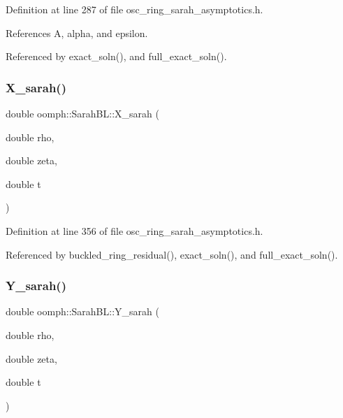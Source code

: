 Definition at line 287 of file osc\+\_\+ring\+\_\+sarah\+\_\+asymptotics.\+h.



References A, alpha, and epsilon.



Referenced by exact\+\_\+soln(), and full\+\_\+exact\+\_\+soln().

\mbox{\label{namespaceoomph_1_1SarahBL_a18945b08e90840028742a9ca2aed94c9}} 
\subsubsection{\texorpdfstring{X\+\_\+sarah()}{X\_sarah()}}
{\footnotesize\ttfamily double oomph\+::\+Sarah\+B\+L\+::\+X\+\_\+sarah (\begin{DoxyParamCaption}\item[{double}]{rho,  }\item[{double}]{zeta,  }\item[{double}]{t }\end{DoxyParamCaption})}



Definition at line 356 of file osc\+\_\+ring\+\_\+sarah\+\_\+asymptotics.\+h.



Referenced by buckled\+\_\+ring\+\_\+residual(), exact\+\_\+soln(), and full\+\_\+exact\+\_\+soln().

\mbox{\label{namespaceoomph_1_1SarahBL_a95d6eff2fce4d76da4adda6acaea78be}} 
\subsubsection{\texorpdfstring{Y\+\_\+sarah()}{Y\_sarah()}}
{\footnotesize\ttfamily double oomph\+::\+Sarah\+B\+L\+::\+Y\+\_\+sarah (\begin{DoxyParamCaption}\item[{double}]{rho,  }\item[{double}]{zeta,  }\item[{double}]{t }\end{DoxyParamCaption})}




